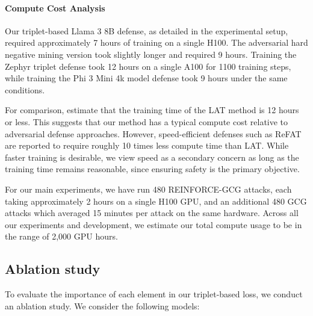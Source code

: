 \documentclass[11pt]{article}
\begin{document}
\paragraph{Compute Cost Analysis}

Our triplet-based Llama 3 8B defense, as detailed in the experimental setup,
required approximately 7 hours of training on a single H100. The adversarial hard negative mining version took slightly longer and required 9 hours.
Training the Zephyr triplet defense took 12 hours on a single A100 for 1100 training steps, while training the Phi 3 Mini 4k model defense took 9 hours under the same conditions.

For comparison, \citet{sheshadri2024latentadversarialtrainingimproves} estimate that
the training time of the LAT method is 12 hours or less. This suggests that our method has a typical compute cost relative to adversarial defense approaches. However, speed-efficient defenses such as ReFAT \citep{yu2025robustllmsafeguardingrefusal} are reported to require roughly 10 times less compute time than LAT. While faster training is desirable, we view speed as a secondary concern as long as the training time remains reasonable,
since ensuring safety is the primary objective.

For our main experiments, we have run 480 REINFORCE-GCG attacks, each taking approximately 2 hours on a single H100 GPU, and an additional 480 GCG attacks which averaged 15 minutes per attack on the same hardware. Across all our experiments and development, we estimate our total compute usage to be in the range of 2,000 GPU hours.

\subsection{Ablation study}
\label{app:ablation}

To evaluate the importance of each element in our triplet-based loss, we conduct an ablation study.
We consider the following models:
\end{document}

